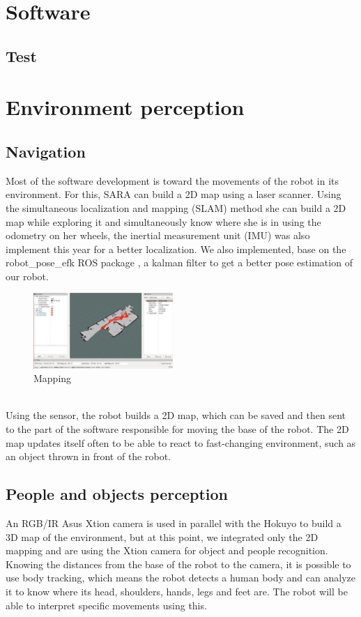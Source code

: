 \documentclass[runningheads,a4paper]{llncs}
\begin{document}
\section{Software}
\subsection*{Test}

\section{Environment perception}
\subsection{Navigation}
\tab Most of the software development is toward the movements of the robot in its environment. For this, SARA can build a 2D map using a laser scanner. Using the simultaneous localization and mapping (SLAM) method she can build a 2D map while exploring it and simultaneously know where she is in using the odometry on her wheels, the inertial measurement unit (IMU) was also implement this year for a better localization. We also implemented, base on the robot\_pose\_efk ROS package \cite{poseefk}, a kalman filter to get a better pose estimation of our robot. \\
\begin{figure}
  \centering
  \includegraphics[width=150pt]{images/map.jpg}
  \caption{Mapping}
\end{figure}\\
Using the sensor, the robot builds a 2D map, which can be saved and then sent to the part of the software responsible for moving the base of the robot. The 2D map updates itself often to be able to react to fast-changing environment, such as an object thrown in front of the robot.



\subsection{People and objects perception}
\tab An RGB/IR Asus Xtion camera is used in parallel with the Hokuyo to build a 3D map of the environment, but at this point, we integrated only the 2D mapping and are using the Xtion camera for object and people recognition. Knowing the distances from the base of the robot to the camera, it is possible to use body tracking, which means the robot detects a human body and can analyze it to know where its head, shoulders, hands, legs and feet are. The robot will be able to interpret specific movements using this. \\
\end{document}
